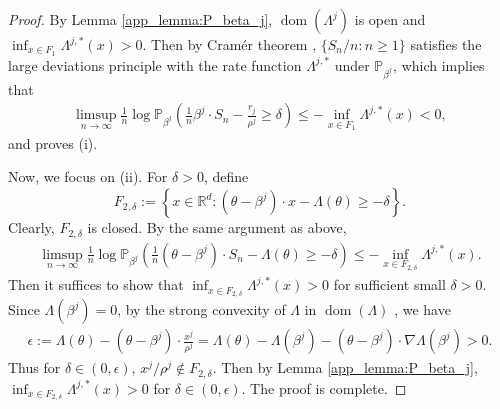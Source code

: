 \documentclass[aap,preprint]{imsart}
\newcommand{\Pro}{{\mathbb{P}}}
\newcommand{\bR}{{\mathbb{R}}}
\theoremstyle{plain}
\theoremstyle{definition}
\begin{document}
\begin{appendix}
\begin{proof}
By Lemma \ref{app_lemma:P_beta_j},
$\operatorname{dom}(\Lambda^j)$ is open and $\inf_{x \in F_1} \Lambda^{j,*}(x) > 0$. Then by Cram\'er theorem \cite[Corollary 6.1.6]{dembo2009large}, $\{S_{n}/n: n\geq 1\}$ satisfies the large deviations principle with the rate function $\Lambda^{j,*}$ under $\Pro_{\beta^j}$, which implies that 
      \begin{align*}
          \limsup_{n \to \infty} \frac{1}{n}  \log \Pro_{\beta^j}\left( \frac{1}{n}\beta^j \cdot S_n -\frac{r_j}{\rho^j} \geq \delta  \right) \leq - \inf_{x \in F_1}\Lambda^{j,*}(x)  < 0,
        \end{align*}
and proves (i).

Now, we focus on (ii). For $\delta > 0$, define
$$
F_{2,\delta} := \left\{x \in \bR^d: (\theta - \beta^j) \cdot x - \Lambda(\theta) \geq -\delta \right\}.
$$
Clearly, $F_{2,\delta}$ is closed. By the same argument as above,
\begin{align*}
          \limsup_{n \to \infty} \frac{1}{n}  \log \Pro_{\beta^j}\left( \frac{1}{n}(\theta -\beta^j) \cdot S_n -\Lambda(\theta) \geq -\delta  \right) \leq - \inf_{x \in F_{2,\delta}} \Lambda^{j,*}(x).
\end{align*}     
Then it suffices to show that $\inf_{x \in F_{2,\delta}} \Lambda^{j,*}(x) > 0$ for sufficient small $\delta > 0$. Since $\Lambda(\beta^j) = 0$, by the strong convexity of $\Lambda$ in $\operatorname{dom}(\Lambda)$ \cite[Theorem 1.3]{brown1986fundamentals},  we have
\begin{align*}
  \epsilon := \Lambda(\theta) - (\theta - \beta^j) \cdot \frac{x^j}{\rho^j} = \Lambda(\theta) - \Lambda(\beta^j) - (\theta - \beta^j) \cdot \nabla \Lambda(\beta^j) > 0.
\end{align*}
Thus for $\delta \in (0,\epsilon)$,
 $x^j/\rho^j \not \in F_{2,\delta}$. Then by Lemma \ref{app_lemma:P_beta_j}, $\inf_{x \in F_{2,\delta}} \Lambda^{j,*}(x) > 0$ for $\delta \in (0,\epsilon)$. The proof is complete.
\end{proof}


\end{appendix}
\end{document}
